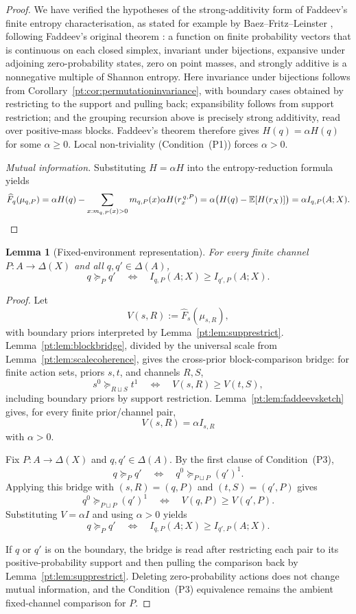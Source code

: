 \documentclass[11pt,a4paper]{article}
\newtheorem{lemma}[theorem]{Lemma}
\theoremstyle{definition}
\newcommand{\E}{\mathbb E}
\newcommand{\Sh}{H}
\newcommand{\1}{\mathbf 1}
\begin{document}
\begin{proof}
We have verified the hypotheses of the strong-additivity form of Faddeev's finite entropy characterisation, as stated
for example by Baez--Fritz--Leinster \cite[Theorem~6]{BaezFritzLeinster2011}, following Faddeev's original theorem
\cite{Faddeev1956}: a function on finite probability vectors that is continuous on each closed simplex, invariant under
bijections, expansive under adjoining zero-probability states, zero on point masses, and strongly additive is a
nonnegative multiple of Shannon entropy.  Here invariance under bijections follows from
Corollary~\ref{pt:cor:permutationinvariance}, with boundary cases obtained by restricting to the support and pulling back;
expansibility follows from support restriction; and the grouping recursion above is precisely strong additivity, read
over positive-mass blocks.  Faddeev's theorem therefore gives $H(q)=\alpha\Sh(q)$ for some $\alpha\ge0$.
Local non-triviality (Condition~\textup{(P1)}) forces $\alpha>0$.

\emph{Mutual information.}  Substituting $H=\alpha\Sh$ into the entropy-reduction formula yields
\[
\widehat F_q(\mu_{q,P})
=\alpha\Sh(q)-\sum_{x:m_{q,P}(x)>0}m_{q,P}(x)\alpha\Sh(r_x^{\,q,P})
=\alpha\bigl(\Sh(q)-\E[\Sh(r_X)]\bigr)
=\alpha I_{q,P}(A;X).
\qedhere
\]
\end{proof}

\begin{lemma}[Fixed-environment representation]\label{pt:lem:globalsketch}
For every finite channel $P:A\to\Delta(X)$ and all $q,q'\in\Delta(A)$,
\[
q\succeq_P q'
\quad\Longleftrightarrow\quad
I_{q,P}(A;X)\ge I_{q',P}(A;X).
\]
\end{lemma}

\begin{proof}
Let
\[
V(s,R):=\widehat F_s(\mu_{s,R}),
\]
with boundary priors interpreted by Lemma~\ref{pt:lem:supprestrict}.  Lemma~\ref{pt:lem:blockbridge}, divided by the universal
scale from Lemma~\ref{pt:lem:scalecoherence}, gives the cross-prior block-comparison bridge: for finite action sets,
priors $s,t$, and channels $R,S$,
\[
s^0\succeq_{R\sqcup S}t^1
\quad\Longleftrightarrow\quad
V(s,R)\ge V(t,S),
\]
including boundary priors by support restriction.  Lemma~\ref{pt:lem:faddeevsketch} gives, for every finite
prior/channel pair,
\[
V(s,R)=\alpha I_{s,R}
\]
with $\alpha>0$.

Fix $P:A\to\Delta(X)$ and $q,q'\in\Delta(A)$.  By the first clause of Condition~\textup{(P3)},
\[
q\succeq_P q'
\quad\Longleftrightarrow\quad
q^0\succeq_{P\sqcup P}(q')^1.
\]
Applying this bridge with $(s,R)=(q,P)$ and $(t,S)=(q',P)$ gives
\[
q^0\succeq_{P\sqcup P}(q')^1
\quad\Longleftrightarrow\quad
V(q,P)\ge V(q',P).
\]
Substituting $V=\alpha I$ and using $\alpha>0$ yields
\[
q\succeq_P q'
\quad\Longleftrightarrow\quad
I_{q,P}(A;X)\ge I_{q',P}(A;X).
\]

If $q$ or $q'$ is on the boundary, the bridge is read after restricting each pair to its positive-probability support
and then pulling the comparison back by Lemma~\ref{pt:lem:supprestrict}.  Deleting
zero-probability actions does not change mutual information, and the Condition~\textup{(P3)} equivalence remains the ambient
fixed-channel comparison for $P$.
\end{proof}
\end{document}
